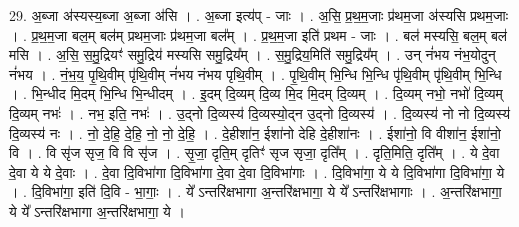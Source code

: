 \documentclass[17pt]{extarticle}
\begin{document}
29. अ॒ब्जा अ॑स्यस्य॒ब्जा अ॒ब्जा अ॑सि । . अ॒ब्जा इत्य॑प् - जाः । . अ॒सि॒ प्र॒थ॒म॒जाः प्र॑थम॒जा अ॑स्यसि प्रथम॒जाः । . प्र॒थ॒म॒जा बल॒म् बल॑म् प्रथम॒जाः प्र॑थम॒जा बल᳚म् । . प्र॒थ॒म॒जा इति॑ प्रथम - जाः । . बल॑ मस्यसि॒ बल॒म् बल॑ मसि । . अ॒सि॒ स॒मु॒द्रियꣳ॑ समु॒द्रिय॑ मस्यसि समु॒द्रिय᳚म् । . स॒मु॒द्रिय॒मिति॑ समु॒द्रिय᳚म् । . उन् नं॑भय नंभ॒योदुन् नं॑भय । . नं॒भ॒य॒ पृ॒थि॒वीम् पृ॑थि॒वीम् नं॑भय नंभय पृथि॒वीम् । . पृ॒थि॒वीम् भि॒न्धि भि॒न्धि पृ॑थि॒वीम् पृ॑थि॒वीम् भि॒न्धि । . भि॒न्धीद मि॒दम् भि॒न्धि भि॒न्धीदम् । . इ॒दम् दि॒व्यम् दि॒व्य मि॒द मि॒दम् दि॒व्यम् । . दि॒व्यम् नभो॒ नभो॑ दि॒व्यम् दि॒व्यम् नभः॑ । . नभ॒ इति॒ नभः॑ । . उ॒द्नो दि॒व्यस्य॑ दि॒व्यस्यो॒द्न उ॒द्नो दि॒व्यस्य॑ । . दि॒व्यस्य॑ नो नो दि॒व्यस्य॑ दि॒व्यस्य॑ नः । . नो॒ दे॒हि॒ दे॒हि॒ नो॒ नो॒ दे॒हि॒ । . दे॒हीशा॑न॒ ईशा॑नो देहि दे॒हीशा॑नः । . ईशा॑नो॒ वि वीशा॑न॒ ईशा॑नो॒ वि । . वि सृ॑ज सृज॒ वि वि सृ॑ज । . सृ॒जा॒ दृति॒म् दृतिꣳ॑ सृज सृजा॒ दृति᳚म् । . दृति॒मिति॒ दृति᳚म् । . ये दे॒वा दे॒वा ये ये दे॒वाः । . दे॒वा दि॒विभा॑गा दि॒विभा॑गा दे॒वा दे॒वा दि॒विभा॑गाः । . दि॒विभा॑गा॒ ये ये दि॒विभा॑गा दि॒विभा॑गा॒ ये । . दि॒विभा॑गा॒ इति॑ दि॒वि - भा॒गाः॒ । . ये᳚ ऽन्तरि॑क्षभागा अ॒न्तरि॑क्षभागा॒ ये ये᳚ ऽन्तरि॑क्षभागाः । . अ॒न्तरि॑क्षभागा॒ ये ये᳚ ऽन्तरि॑क्षभागा अ॒न्तरि॑क्षभागा॒ ये । \newline
\end{document}

